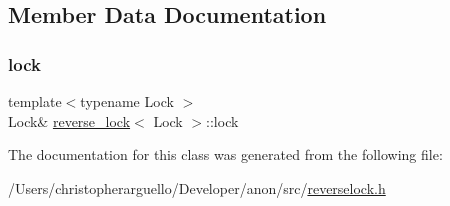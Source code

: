 \subsection{Member Data Documentation}
\mbox{\label{classreverse__lock_a915524c7621bb83ccca8e7368d4f0b88}} 
\subsubsection{\texorpdfstring{lock}{lock}}
{\footnotesize\ttfamily template$<$typename Lock $>$ \\
Lock\& \mbox{\hyperlink{classreverse__lock}{reverse\+\_\+lock}}$<$ Lock $>$\+::lock\hspace{0.3cm}{\ttfamily [private]}}



The documentation for this class was generated from the following file\+:\begin{DoxyCompactItemize}
\item 
/\+Users/christopherarguello/\+Developer/anon/src/\mbox{\hyperlink{reverselock_8h}{reverselock.\+h}}\end{DoxyCompactItemize}
